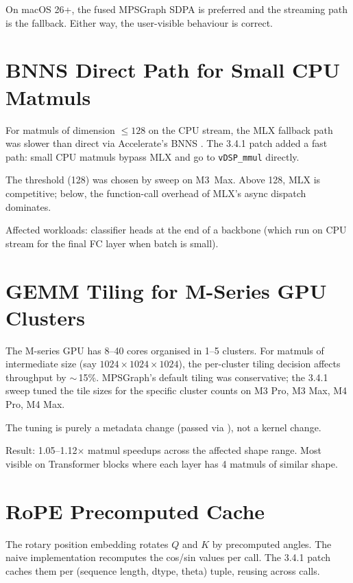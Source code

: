 On macOS 26+, the fused MPSGraph SDPA is preferred and the
streaming path is the fallback. Either way, the user-visible
behaviour is correct.

\section{BNNS Direct Path for Small CPU Matmuls}
\label{sec:no_compile_sweep:bnns_matmul}

For matmuls of dimension $\leq 128$ on the CPU stream, the MLX
fallback path was slower than direct  via
Accelerate's BNNS \cite{apple_accelerate}. The 3.4.1 patch
added a fast path: small CPU matmuls bypass MLX and go to
\texttt{vDSP\_mmul} directly.

The threshold (128) was chosen by sweep on M3~Max. Above 128,
MLX is competitive; below, the function-call overhead of MLX's
async dispatch dominates.

Affected workloads: classifier heads at the end of a backbone
(which run on CPU stream for the final FC layer when batch is
small).

\section{GEMM Tiling for M-Series GPU Clusters}
\label{sec:no_compile_sweep:gemm_tiling}

The M-series GPU has 8--40 cores organised in 1--5 clusters.
For matmuls of intermediate size (say $1024 \times 1024 \times 1024$),
the per-cluster tiling decision affects throughput by
$\sim$\,15\%. MPSGraph's default tiling was conservative; the
3.4.1 sweep tuned the tile sizes for the specific cluster
counts on M3 Pro, M3 Max, M4 Pro, M4 Max.

The tuning is purely a metadata change (passed via
), not a kernel change.

Result: 1.05--1.12$\times$ matmul speedups across the affected
shape range. Most visible on Transformer blocks where each
layer has 4 matmuls of similar shape.

\section{RoPE Precomputed Cache}
\label{sec:no_compile_sweep:rope_cache}

The rotary position embedding \cite{su_roformer_2021} rotates
$Q$ and $K$ by precomputed angles. The naive implementation
recomputes the cos/sin values per call. The 3.4.1 patch caches
them per (sequence length, dtype, theta) tuple, reusing across
calls.

